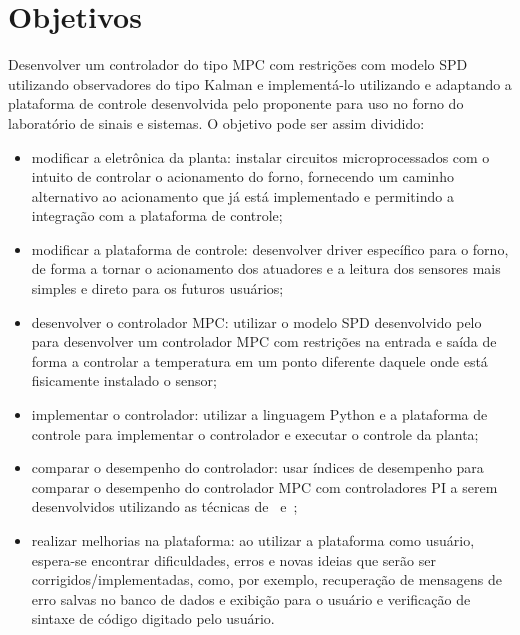 
\chapter{Objetivos}%
\label{chp:objectives}

Desenvolver um controlador do tipo MPC com restrições com modelo SPD utilizando
observadores do tipo Kalman e implementá-lo utilizando e adaptando a plataforma
de controle desenvolvida pelo proponente para uso no forno do laboratório de
sinais e sistemas. O objetivo pode ser assim dividido:

\begin{itemize}
      \item modificar a eletrônica da planta: instalar circuitos
            microprocessados com o intuito de controlar o acionamento do forno,
            fornecendo um caminho alternativo ao acionamento que já está
            implementado e permitindo a integração com a plataforma de controle;
      \item modificar a plataforma de controle: desenvolver driver específico
            para o forno, de forma a tornar o acionamento dos atuadores e a
            leitura dos sensores mais simples e direto para os futuros usuários;
      \item desenvolver o controlador MPC\@: utilizar o modelo SPD desenvolvido
            pelo~\textcite{masterthesis:nelson} para desenvolver um
            controlador MPC com restrições na entrada e saída de forma a
            controlar a temperatura em um ponto diferente daquele onde está
            fisicamente instalado o sensor;
      \item implementar o controlador: utilizar a linguagem Python e a
            plataforma de controle para implementar o controlador e executar o
            controle da planta;
      \item comparar o desempenho do controlador: usar índices de desempenho
            para comparar o desempenho do controlador MPC com controladores PI a
            serem desenvolvidos utilizando as técnicas
            de~\textcite{article:clarke} e~\textcite{article:martins};
      \item realizar melhorias na plataforma: ao utilizar a plataforma como
            usuário, espera-se encontrar dificuldades, erros e novas ideias que
            serão ser corrigidos/implementadas, como, por exemplo, recuperação
            de mensagens de erro salvas no banco de dados e exibição para o
            usuário e verificação de sintaxe de código digitado pelo usuário.
\end{itemize}
